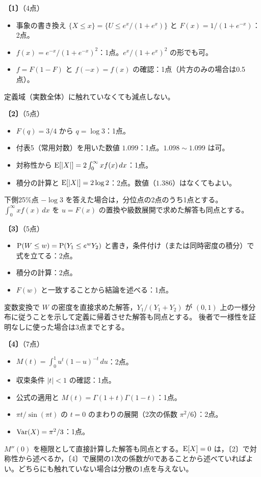 \documentclass[a4paper,11pt]{ltjsarticle}
\renewcommand{\ans}[1]{\par\medskip\noindent\textbf{〔#1〕}\quad}
\renewcommand{\points}[1]{\hfill\textnormal{（#1点）}\par\nobreak}
\begin{document}
\ans{1}\points{4}
\begin{itemize}
\item 事象の書き換え $\{X\le x\}=\{U\le e^x/(1+e^x)\}$ と $F(x)=1/(1+e^{-x})$：2点。
\item $f(x)=e^{-x}/(1+e^{-x})^2$：1点。$e^{x}/(1+e^{x})^2$ の形でも可。
\item $f=F(1-F)$ と $f(-x)=f(x)$ の確認：1点（片方のみの場合は0.5点）。
\end{itemize}
定義域（実数全体）に触れていなくても減点しない。

\ans{2}\points{5}
\begin{itemize}
\item $F(q)=3/4$ から $q=\log3$：1点。
\item 付表5（常用対数）を用いた数値 $1.099$：1点。$1.098\sim1.099$ は可。
\item 対称性から $\operatorname{E}[|X|]=2\int_0^\infty xf(x)\,dx$：1点。
\item 積分の計算と $\operatorname{E}[|X|]=2\log2$：2点。数値（$1.386$）はなくてもよい。
\end{itemize}
下側25\%点 $-\log3$ を答えた場合は，分位点の2点のうち1点とする。
$\int_0^\infty xf(x)\,dx$ を $u=F(x)$ の置換や級数展開で求めた解答も同点とする。

\ans{3}\points{5}
\begin{itemize}
\item $\operatorname{P}(W\le w)=\operatorname{P}(Y_1\le e^wY_2)$ と書き，条件付け（または同時密度の積分）で式を立てる：2点。
\item 積分の計算：2点。
\item $F(w)$ と一致することから結論を述べる：1点。
\end{itemize}
変数変換で $W$ の密度を直接求めた解答，$Y_1/(Y_1+Y_2)$ が $(0,1)$ 上の一様分布に従うことを示して定義に帰着させた解答も同点とする。
後者で一様性を証明なしに使った場合は3点までとする。

\ans{4}\points{7}
\begin{itemize}
\item $M(t)=\int_0^1u^t(1-u)^{-t}\,du$：2点。
\item 収束条件 $|t|<1$ の確認：1点。
\item 公式の適用と $M(t)=\Gamma(1+t)\Gamma(1-t)$：1点。
\item $\pi t/\sin(\pi t)$ の $t=0$ のまわりの展開（2次の係数 $\pi^2/6$）：2点。
\item $\operatorname{Var}(X)=\pi^2/3$：1点。
\end{itemize}
$M''(0)$ を極限として直接計算した解答も同点とする。$\operatorname{E}[X]=0$ は，〔2〕で対称性から述べるか，〔4〕で展開の1次の係数が0であることから述べていればよい。どちらにも触れていない場合は分散の1点を与えない。
\end{document}
